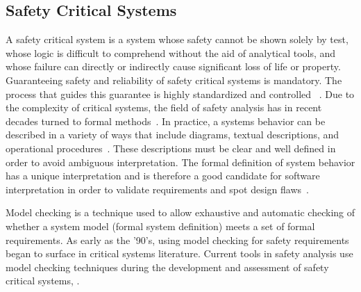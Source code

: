 \subsection{Safety Critical Systems}
\label{sec:SA_background}
A safety critical system is a system whose safety cannot be shown solely by test, whose logic is difficult to comprehend without the aid of analytical tools, and whose failure can directly or indirectly cause significant loss of life or property\cite{SAE:ARP4761}. Guaranteeing safety and reliability of safety critical systems is mandatory. The process that guides this guarantee is highly standardized and controlled~\cite{RTCA:StdC,SAE:ARP4761} . Due to the complexity of critical systems, the field of safety analysis has in recent decades turned to formal methods~\cite{MattareiThesis,Bozzano:2010:DSA:1951720}. In practice, a systems behavior can be described in a variety of ways that include diagrams, textual descriptions, and operational procedures~\cite{SAE:ARP4754A}. These descriptions must be clear and well defined in order to avoid ambiguous interpretation. The formal definition of system behavior has a unique interpretation and is therefore a good candidate for software interpretation in order to validate requirements and spot design flaws~\cite{Joshi05:Dasc}. 

Model checking is a technique used to allow exhaustive and automatic checking of whether a system model (formal system definition) meets a set of formal requirements. As early as the '90's, using model checking for safety requirements began to surface in critical systems literature\cite{10.1007/3-540-61772-8_46,DBLP:conf/safecomp/CimattiGMRTT98,DBLP:conf/edcc/BernardeschiFGM96}. Current tools in safety analysis use model checking techniques during the development and assessment of safety critical systems, \cite{MattareiThesis,info17:HaLuHo,CAV2015:BoCiGrMa,symbAltaRica,DBLP:conf/tacas/BittnerBCCGGMMZ16}.






